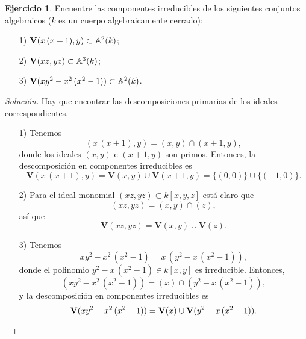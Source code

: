 \documentclass{article}
\theoremstyle{definition}
\newtheorem{ejerc}{Ejercicio}
\newenvironment{solucion}{\begin{proof}[Solución]}{\end{proof}}
\begin{document}
\begin{ejerc}
  Encuentre las componentes irreducibles de los siguientes conjuntos algebraicos
  ($k$ es un cuerpo algebraicamente cerrado):
  \begin{enumerate}
  \item[1)] $\mathbf{V} (x\,(x+1), y) \subset \AA^2 (k)$;
  \item[2)] $\mathbf{V} (xz, yz) \subset \AA^3 (k)$;
  \item[3)] $\mathbf{V} (xy^2-x^2\,(x^2-1)) \subset \AA^2 (k)$.
  \end{enumerate}

  \ifdefined\solutions\begin{solucion}
    Hay que encontrar las descomposiciones primarias de los ideales
    correspondientes.

    \begin{enumerate}
    \item[1)] Tenemos
      $$(x\,(x+1), y) = (x,y) \cap (x+1,y),$$
      donde los ideales $(x,y)$ e $(x+1,y)$ son primos. Entonces, la
      descomposición en componentes irreducibles es
      \[ \mathbf{V} (x\,(x+1), y) =
         \mathbf{V} (x,y) \cup \mathbf{V} (x+1, y) =
         \{ (0,0) \} \cup \{ (-1,0) \}. \]

    \item[2)] Para el ideal monomial $(xz, yz) \subset k [x,y,z]$ está claro que
      $$(xz, yz) = (x,y) \cap (z),$$
      así que
      $$\mathbf{V} (xz, yz) = \mathbf{V} (x,y) \cup \mathbf{V} (z).$$

    \item[3)] Tenemos
      $$xy^2-x^2\,(x^2-1) = x\,(y^2 - x\,(x^2-1)),$$
      donde el polinomio $y^2 - x\,(x^2-1) \in k [x,y]$ es
      irreducible. Entonces,
      $$(xy^2-x^2\,(x^2-1)) = (x) \cap (y^2 - x\,(x^2-1)),$$
      y la descomposición en componentes irreducibles es
      \[ \mathbf{V} (xy^2-x^2\,(x^2-1)) =
         \mathbf{V} (x) \cup \mathbf{V} (y^2 - x\,(x^2-1)). \qedhere \]
    \end{enumerate}
  \end{solucion}\fi
\end{ejerc}
\end{document}
